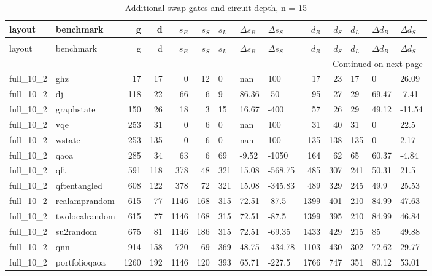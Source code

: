 \begin{longtable}{llrrrrlllrrlll}
\caption{Additional swap gates and circuit depth, n = 15} \label{benchmark-table-15} \\
\toprule
layout & benchmark & g & d & $s_B$ & $s_S$ & $s_L$ & $\Delta s_B$ & $\Delta s_S$ & $d_B$ & $d_S$ & $d_L$ & $\Delta d_B$ & $\Delta d_S$ \\
\midrule
\endfirsthead
\caption[]{Additional swap gates and circuit depth, n = 15} \\
\toprule
layout & benchmark & g & d & $s_B$ & $s_S$ & $s_L$ & $\Delta s_B$ & $\Delta s_S$ & $d_B$ & $d_S$ & $d_L$ & $\Delta d_B$ & $\Delta d_S$ \\
\midrule
\endhead
\midrule
\multicolumn{14}{r}{Continued on next page} \\
\midrule
\endfoot
\bottomrule
\endlastfoot
full\_10\_2 & ghz & 17 & 17 & 0 & 12 & 0 & nan & 100 & 17 & 23 & 17 & 0 & 26.09 \\
full\_10\_2 & dj & 118 & 22 & 66 & 6 & 9 & 86.36 & -50 & 95 & 27 & 29 & 69.47 & -7.41 \\
full\_10\_2 & graphstate & 150 & 26 & 18 & 3 & 15 & 16.67 & -400 & 57 & 26 & 29 & 49.12 & -11.54 \\
full\_10\_2 & vqe & 253 & 31 & 0 & 6 & 0 & nan & 100 & 31 & 40 & 31 & 0 & 22.5 \\
full\_10\_2 & wstate & 253 & 135 & 0 & 6 & 0 & nan & 100 & 135 & 138 & 135 & 0 & 2.17 \\
full\_10\_2 & qaoa & 285 & 34 & 63 & 6 & 69 & -9.52 & -1050 & 164 & 62 & 65 & 60.37 & -4.84 \\
full\_10\_2 & qft & 591 & 118 & 378 & 48 & 321 & 15.08 & -568.75 & 485 & 307 & 241 & 50.31 & 21.5 \\
full\_10\_2 & qftentangled & 608 & 122 & 378 & 72 & 321 & 15.08 & -345.83 & 489 & 329 & 245 & 49.9 & 25.53 \\
full\_10\_2 & realamprandom & 615 & 77 & 1146 & 168 & 315 & 72.51 & -87.5 & 1399 & 401 & 210 & 84.99 & 47.63 \\
full\_10\_2 & twolocalrandom & 615 & 77 & 1146 & 168 & 315 & 72.51 & -87.5 & 1399 & 395 & 210 & 84.99 & 46.84 \\
full\_10\_2 & su2random & 675 & 81 & 1146 & 186 & 315 & 72.51 & -69.35 & 1433 & 429 & 215 & 85 & 49.88 \\
full\_10\_2 & qnn & 914 & 158 & 720 & 69 & 369 & 48.75 & -434.78 & 1103 & 430 & 302 & 72.62 & 29.77 \\
full\_10\_2 & portfolioqaoa & 1260 & 192 & 1146 & 120 & 393 & 65.71 & -227.5 & 1766 & 747 & 351 & 80.12 & 53.01 \\

\end{longtable}
